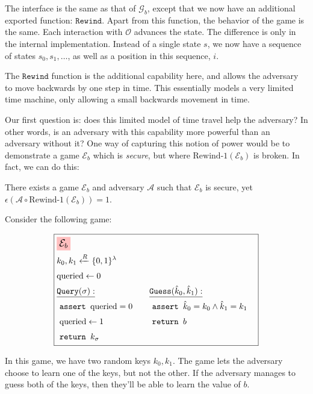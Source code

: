 The interface is the same as that of $\mathcal{G}_b$, except that
we now have an additional exported function: $\texttt{Rewind}$.
Apart from this function, the behavior of the game is the same.
Each interaction with $\mathcal{O}$ advances the state.
The difference is only in the internal implementation.
Instead of a single state $s$, we now have a sequence of states
$s_0, s_1, \ldots$, as well as a position in this sequence, $i$.

The $\texttt{Rewind}$ function is the additional capability here,
and allows the adversary to move backwards by one step in time.
This essentially models a very limited time machine, only
allowing a small backwards movement in time.

Our first question is: does this limited model of time travel help
the adversary?
In other words, is an adversary with this capability more powerful
than an adversary without it? 
One way of capturing this notion of power would be to demonstrate
a game $\mathcal{E}_b$ which is \emph{secure}, but where
$\text{Rewind-1}(\mathcal{E}_b)$ is broken.
In fact, we can do this:

\begin{claim}
    \label{claim:rewind-1-is-stronger}
    There exists a game $\mathcal{E}_b$ and adversary $\mathcal{A}$ such that 
    $\mathcal{E}_b$ is secure, yet $\epsilon(\mathcal{A} \circ \text{Rewind-1}(\mathcal{E}_b)) = 1$.
\end{claim}

Consider the following game:

\begin{game}
\captionsetup{justification=centering}
$$
\boxed{
\begin{aligned}
&\colorbox{pink}{\large $\mathcal{E}_b$}\cr
&k_0, k_1 \xleftarrow{R} \{0, 1\}^\lambda\cr
&\text{queried} \gets 0\cr
&\begin{aligned}
    &\underline{\texttt{Query}(\sigma):}\cr
    &\ \texttt{assert } \text{queried} = 0\cr
    &\ \text{queried} \gets 1\cr
    &\ \texttt{return } k_\sigma\cr
\end{aligned}
&\begin{aligned}
    &\underline{\texttt{Guess}(\hat{k}_0, \hat{k}_1):}\cr
    &\ \texttt{assert } \hat{k}_0 = k_0 \land \hat{k}_1 = k_1\cr
    &\ \texttt{return } b\cr
    &\cr
\end{aligned}\cr
\end{aligned}
}
$$
\end{game}

In this game, we have two random keys $k_0, k_1$.
The game lets the adversary choose to learn one of the keys, but not
the other.
If the adversary manages to guess both of the keys, then they'll be
able to learn the value of $b$.

